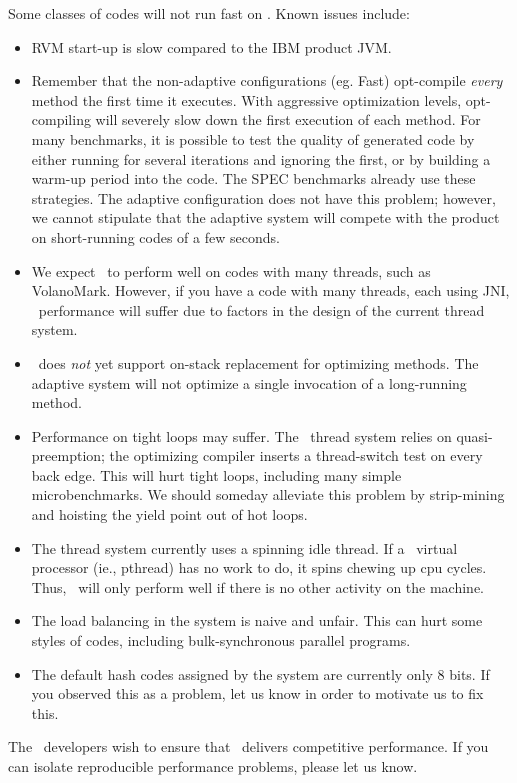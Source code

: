 Some classes of codes will not run fast on \jp.  Known issues include:
\begin{itemize}
\item RVM start-up is slow compared to the IBM product JVM.
\item Remember that the non-adaptive configurations (eg. Fast) opt-compile
{\em every} method the first time it executes.  With aggressive optimization
levels, opt-compiling will severely slow down the first execution of
each method.  For many benchmarks, it is possible to test the quality
of generated code by either running for several iterations and ignoring
the first, or by building a warm-up period into the code.  The SPEC benchmarks
already use these strategies.  The adaptive configuration does not
have this problem; however, we cannot stipulate that the adaptive
system will compete with the product on short-running codes of a few seconds.
\item We expect \jp\ to perform well on codes with many threads, such as
VolanoMark.  However, if you have a code with many threads, each using
JNI, \jp\ performance will suffer due to factors in the design of
the current thread system.
\item \jp\ does {\em not} yet support on-stack replacement for
optimizing methods.  The adaptive system will not optimize a single
invocation of a long-running 
method.
\item Performance on tight loops may suffer.  The \jp\ thread system
relies on quasi-preemption; the optimizing compiler inserts a thread-switch
test on every back edge.  This will hurt tight loops, including many
simple microbenchmarks.  We should someday alleviate this problem by
strip-mining and hoisting the yield point out of hot loops.
\item The thread system currently uses a spinning idle thread. If a \jp\ virtual processor (ie., pthread) has no work to do, it spins chewing up cpu cycles.  Thus, \jp\ will only perform well if there is no other activity on the machine.
\item The load balancing in the system is naive and unfair.  This can hurt some styles of codes, including bulk-synchronous parallel programs.
\item The default hash codes assigned by the system are currently only 8
bits.  If you observed this as a problem, let us know in order to motivate
us to fix this.
\end{itemize}

The \jp\ developers wish to ensure that \jp\ delivers competitive performance.
If you can isolate reproducible performance problems, please let us
know. 
